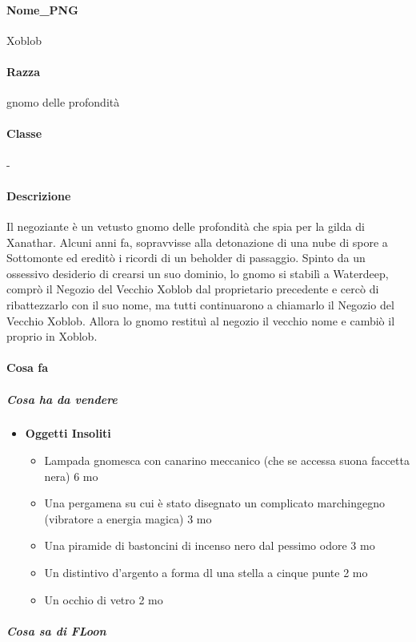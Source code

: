 \documentclass{article}
\begin{document}
\paragraph{Nome\_PNG}Xoblob
\paragraph{Razza} gnomo delle profondità
\paragraph{Classe} -
\paragraph{Descrizione}  Il negoziante è un vetusto gnomo delle profondità che spia per la gilda di Xanathar. Alcuni anni fa, sopravvisse alla detonazione di una nube di spore a Sottomonte ed ereditò i ricordi di un beholder di passaggio. Spinto da un ossessivo desiderio di crearsi un suo dominio, lo gnomo si stabilì a Waterdeep, comprò il Negozio del Vecchio Xoblob dal proprietario precedente e cercò di ribattezzarlo con il suo nome, ma tutti continuarono a chiamarlo il Negozio del Vecchio Xoblob. Allora lo gnomo restituì al negozio il vecchio nome e cambiò il proprio in Xoblob.
\paragraph{Cosa fa } 
    \subparagraph{Cosa ha da vendere}
    \begin{itemize}
        \item \textbf{Oggetti Insoliti} \begin{itemize}
                \item Lampada gnomesca con canarino meccanico (che se accessa suona faccetta nera) 6 mo 
                \item Una pergamena su cui è stato disegnato un complicato
                marchingegno (vibratore a energia magica) 3 mo
                \item Una piramide di bastoncini di incenso nero dal pessimo
                odore 3 mo
                \item Un distintivo d'argento a forma dl una stella a cinque
                punte 2 mo
                \item Un occhio di vetro 2 mo
            \end{itemize}
        \end{itemize}
    \subparagraph{Cosa sa di FLoon}
    
\end{document}
